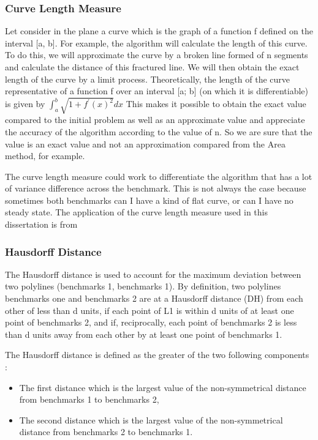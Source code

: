 \documentclass{article}
\begin{document}
\subsubsection{Curve Length Measure}


Let consider in the plane a curve \citep{moran1966measuring} which is the graph of a function f defined on the interval [a, b]. For example, the algorithm will calculate the length of this curve. To do this, we will approximate the curve by a broken line formed of n segments and calculate the distance of this fractured line. We will then obtain the exact length of the curve by a limit process.
Theoretically, the length of the curve representative of a function f over an interval [a; b] (on which it is differentiable) is given by $\int_{a}^{b} \sqrt{1+f^{\prime}(x)^{2}} d x$
This makes it possible to obtain the exact value compared to the initial problem as well as an approximate value and appreciate the accuracy of the algorithm according to the value of n. So we are sure that the value is an exact value and not an approximation compared from the Area method, for example.

The curve length measure could work to differentiate the algorithm that has a lot of variance difference across the benchmark. This is not always the case because sometimes both benchmarks can I have a kind of flat curve, or can I have no steady state.
The application of the curve length measure used in this dissertation is from \citep{jekel2019similarity}
\subsubsection{Hausdorff Distance }
The Hausdorff distance \citep{belogay1997calculating} is used to account for the maximum deviation between two polylines (benchmarks 1, benchmarks 1). By definition, two polylines benchmarks one and benchmarks 2 are at a Hausdorff distance (DH) from each other of less than d units, if each point of L1 is within d units of at least one point of benchmarks 2, and if, reciprocally, each point of benchmarks 2 is less than d units away from each other by at least one point of benchmarks 1.

The Hausdorff distance is defined as the greater of the two following components :

\begin{itemize}
    \item The first distance which is the largest value of the non-symmetrical distance from benchmarks 1 to benchmarks 2,
    \item The second distance which is the largest value of the non-symmetrical distance from benchmarks 2 to benchmarks 1.
\end{itemize}
\end{document}
